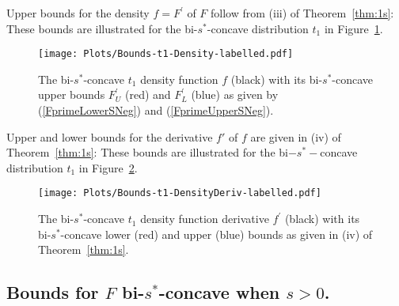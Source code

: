 \documentclass[11pt]{amsart}
\numberwithin{equation}{section}
\theoremstyle{definition}\newtheorem{definition}{Definition}
\theoremstyle{remark}\newtheorem{assumption}{Assumption}
\theoremstyle{remark}\newtheorem{remark}{Remark}
\theoremstyle{definition}\newtheorem{example}{Example}
\theoremstyle{plain}\newtheorem{question}{Question}
\theoremstyle{plain}\newtheorem{theorem}{Theorem}
\theoremstyle{plain}\newtheorem{lemma}{Lemma}
\theoremstyle{plain}\newtheorem{proposition}{Proposition}
\theoremstyle{plain}\newtheorem{corollary}{Corollary}
\theoremstyle{plain}\newtheorem{conjecture}{Conjecture}
\begin{document}
Upper  bounds for the density $f = F^{\prime} $ of $F$ follow from (iii)  of Theorem~\ref{thm:1s}: 
These bounds are illustrated for the bi-$s^*$-concave distribution $t_1$ in Figure~\ref{fig:fig2}.
 
  \begin{figure}[ht]
    \centering
    \texttt{[image: Plots/Bounds-t1-Density-labelled.pdf]} 
    \caption{The bi-$s^*$-concave $t_1$  density function $f$ (black) with its bi-$s^*$-concave  upper bounds 
    $F_U^{\prime}$ (red) and $F_L^{\prime}$ (blue) as given by (\ref{FprimeLowerSNeg}) and (\ref{FprimeUpperSNeg}).}
     \label{fig:fig2}
 \end{figure}
 
Upper and lower bounds for the derivative $f'$ of $f$ are given in (iv) of Theorem~\ref{thm:1s}:
These bounds are illustrated for the bi$-s^*-$concave distribution $t_1$ in Figure~\ref{fig:fig3}.
 
 \begin{figure}[ht]
    \centering
    \texttt{[image: Plots/Bounds-t1-DensityDeriv-labelled.pdf]} 
    \caption{The bi-$s^*$-concave $t_1$  density function derivative $f^{\prime}$ (black) with its bi-$s^*$-concave 
    lower (red) and upper (blue) bounds as given in (iv) of Theorem~\ref{thm:1s}.}
     \label{fig:fig3}
 \end{figure}
\medskip


\subsection{Bounds for $F$ bi-$s^*$-concave when $s>0$.}
\label{subsec:BoundsForSpos}
\end{document}
